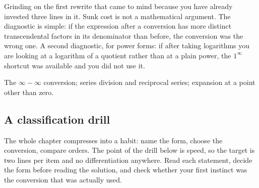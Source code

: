 \begin{trap}
Grinding on the first rewrite that came to mind because you have already invested three lines in it. Sunk cost is not a mathematical argument. The diagnostic is simple: if the expression after a conversion has more distinct transcendental factors in its denominator than before, the conversion was the wrong one. A second diagnostic, for power forms: if after taking logarithms you are looking at a logarithm of a quotient rather than at a plain power, the $1^{\infty}$ shortcut was available and you did not use it.
\end{trap}

\begin{seealsob}The $\infty-\infty$ conversion; series division and reciprocal series; expansion at a point other than zero.\end{seealsob}

\subsection{A classification drill}

The whole chapter compresses into a habit: name the form, choose the conversion, compare orders. The point of the drill below is speed, so the target is two lines per item and no differentiation anywhere. Read each statement, decide the form before reading the solution, and check whether your first instinct was the conversion that was actually used.

